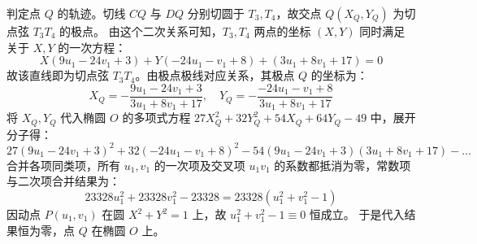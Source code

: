 \begin{solution}
判定点 $Q$ 的轨迹。切线 $CQ$ 与 $DQ$ 分别切圆于 $T_3, T_4$，故交点 $Q(X_Q, Y_Q)$ 为切点弦 $T_3 T_4$ 的极点。
由这个二次关系可知，$T_3, T_4$ 两点的坐标 $(X, Y)$ 同时满足关于 $X, Y$ 的一次方程：
$$ X(9 u_1 - 24 v_1 + 3) + Y(-24 u_1 - v_1 + 8) + (3 u_1 + 8 v_1 + 17) = 0 $$
故该直线即为切点弦 $T_3 T_4$。由极点极线对应关系，其极点 $Q$ 的坐标为：
$$ X_Q = -\frac{9 u_1 - 24 v_1 + 3}{3 u_1 + 8 v_1 + 17}, \quad Y_Q = -\frac{-24 u_1 - v_1 + 8}{3 u_1 + 8 v_1 + 17} $$
将 $X_Q, Y_Q$ 代入椭圆 $O$ 的多项式方程 $27X_Q^2 + 32Y_Q^2 + 54X_Q + 64Y_Q - 49$ 中，展开分子得：
$$ 27(9 u_1 - 24 v_1 + 3)^2 + 32(-24 u_1 - v_1 + 8)^2 - 54(9 u_1 - 24 v_1 + 3)(3 u_1 + 8 v_1 + 17) - \dots $$
合并各项同类项，所有 $u_1, v_1$ 的一次项及交叉项 $u_1 v_1$ 的系数都抵消为零，常数项与二次项合并结果为：
$$ 23328 u_1^2 + 23328 v_1^2 - 23328 = 23328(u_1^2 + v_1^2 - 1) $$
因动点 $P(u_1, v_1)$ 在圆 $X^2+Y^2=1$ 上，故 $u_1^2+v_1^2-1 \equiv 0$ 恒成立。
于是代入结果恒为零，点 $Q$ 在椭圆 $O$ 上。
\end{solution}


